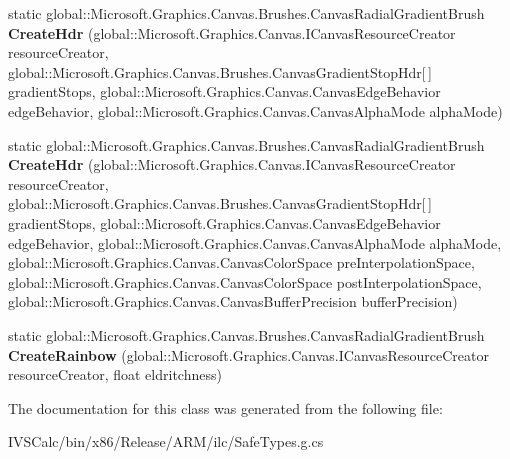 \begin{DoxyCompactItemize}
\item 
\mbox{\label{class_microsoft_1_1_graphics_1_1_canvas_1_1_brushes_1_1_canvas_radial_gradient_brush_a56c87e8ee5b2516dfc061d3207cbba62}} 
static global\+::\+Microsoft.\+Graphics.\+Canvas.\+Brushes.\+Canvas\+Radial\+Gradient\+Brush {\bfseries Create\+Hdr} (global\+::\+Microsoft.\+Graphics.\+Canvas.\+I\+Canvas\+Resource\+Creator resource\+Creator, global\+::\+Microsoft.\+Graphics.\+Canvas.\+Brushes.\+Canvas\+Gradient\+Stop\+Hdr\mbox{[}$\,$\mbox{]} gradient\+Stops, global\+::\+Microsoft.\+Graphics.\+Canvas.\+Canvas\+Edge\+Behavior edge\+Behavior, global\+::\+Microsoft.\+Graphics.\+Canvas.\+Canvas\+Alpha\+Mode alpha\+Mode)
\item 
\mbox{\label{class_microsoft_1_1_graphics_1_1_canvas_1_1_brushes_1_1_canvas_radial_gradient_brush_a51c1cc7d4745f7d2f3e322b078cc04cb}} 
static global\+::\+Microsoft.\+Graphics.\+Canvas.\+Brushes.\+Canvas\+Radial\+Gradient\+Brush {\bfseries Create\+Hdr} (global\+::\+Microsoft.\+Graphics.\+Canvas.\+I\+Canvas\+Resource\+Creator resource\+Creator, global\+::\+Microsoft.\+Graphics.\+Canvas.\+Brushes.\+Canvas\+Gradient\+Stop\+Hdr\mbox{[}$\,$\mbox{]} gradient\+Stops, global\+::\+Microsoft.\+Graphics.\+Canvas.\+Canvas\+Edge\+Behavior edge\+Behavior, global\+::\+Microsoft.\+Graphics.\+Canvas.\+Canvas\+Alpha\+Mode alpha\+Mode, global\+::\+Microsoft.\+Graphics.\+Canvas.\+Canvas\+Color\+Space pre\+Interpolation\+Space, global\+::\+Microsoft.\+Graphics.\+Canvas.\+Canvas\+Color\+Space post\+Interpolation\+Space, global\+::\+Microsoft.\+Graphics.\+Canvas.\+Canvas\+Buffer\+Precision buffer\+Precision)
\item 
\mbox{\label{class_microsoft_1_1_graphics_1_1_canvas_1_1_brushes_1_1_canvas_radial_gradient_brush_a19932ca8ae9416ca37a762c1184257db}} 
static global\+::\+Microsoft.\+Graphics.\+Canvas.\+Brushes.\+Canvas\+Radial\+Gradient\+Brush {\bfseries Create\+Rainbow} (global\+::\+Microsoft.\+Graphics.\+Canvas.\+I\+Canvas\+Resource\+Creator resource\+Creator, float eldritchness)
\end{DoxyCompactItemize}


The documentation for this class was generated from the following file\+:\begin{DoxyCompactItemize}
\item 
I\+V\+S\+Calc/bin/x86/\+Release/\+A\+R\+M/ilc/Safe\+Types.\+g.\+cs\end{DoxyCompactItemize}
